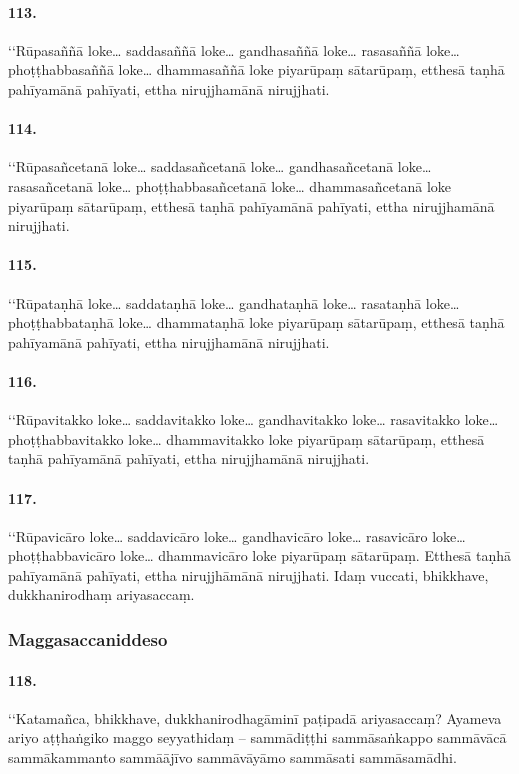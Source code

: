 \paragraph{113.} ‘‘Rūpasaññā loke… saddasaññā loke… gandhasaññā loke… rasasaññā loke… phoṭṭhabbasaññā loke… dhammasaññā loke piyarūpaṃ sātarūpaṃ, etthesā taṇhā pahīyamānā pahīyati, ettha nirujjhamānā nirujjhati.

\paragraph{114.} ‘‘Rūpasañcetanā loke… saddasañcetanā loke… gandhasañcetanā loke… rasasañcetanā loke… phoṭṭhabbasañcetanā loke… dhammasañcetanā loke piyarūpaṃ sātarūpaṃ, etthesā taṇhā pahīyamānā pahīyati, ettha nirujjhamānā nirujjhati.

\paragraph{115.} ‘‘Rūpataṇhā loke… saddataṇhā loke… gandhataṇhā loke… rasataṇhā loke… phoṭṭhabbataṇhā loke… dhammataṇhā loke piyarūpaṃ sātarūpaṃ, etthesā taṇhā pahīyamānā pahīyati, ettha nirujjhamānā nirujjhati.

\paragraph{116.} ‘‘Rūpavitakko loke… saddavitakko loke… gandhavitakko loke… rasavitakko loke… phoṭṭhabbavitakko loke… dhammavitakko loke piyarūpaṃ sātarūpaṃ, etthesā taṇhā pahīyamānā pahīyati, ettha nirujjhamānā nirujjhati.

\paragraph{117.} ‘‘Rūpavicāro loke… saddavicāro loke… gandhavicāro loke… rasavicāro loke… phoṭṭhabbavicāro loke… dhammavicāro loke piyarūpaṃ sātarūpaṃ. Etthesā taṇhā pahīyamānā pahīyati, ettha nirujjhāmānā nirujjhati. Idaṃ vuccati, bhikkhave, dukkhanirodhaṃ ariyasaccaṃ.

\subsubsection{Maggasaccaniddeso}

\paragraph{118.} ‘‘Katamañca, bhikkhave, dukkhanirodhagāminī paṭipadā ariyasaccaṃ? Ayameva ariyo aṭṭhaṅgiko maggo seyyathidaṃ – sammādiṭṭhi sammāsaṅkappo sammāvācā sammākammanto sammāājīvo sammāvāyāmo sammāsati sammāsamādhi.

